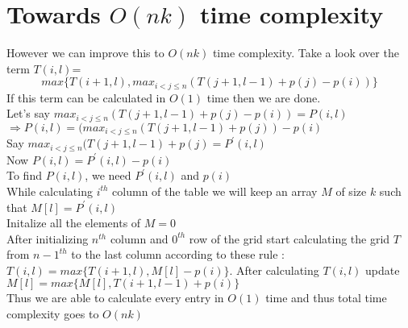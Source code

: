 \documentclass{article}
\begin{document}
\section{Towards $O(nk)$ time complexity}
However we can improve this to $O(nk)$ time complexity. Take a look over the term $T(i,l)$=$$max\{T(i+1,l),max_{i<j\leq n}(T(j+1,l-1)+p(j)-p(i))\}$$
If this term can be calculated in $O(1)$ time then we are done.\\
Let's say $max_{i<j\leq n}(T(j+1,l-1)+p(j)-p(i))=P(i,l)$\\
$\Rightarrow P(i,l)=(max_{i<j\leq n}(T(j+1,l-1)+p(j))-p(i)$\\
Say $max_{i<j\leq n}(T(j+1,l-1)+p(j)=P^{'}(i,l)$\\
Now $P(i,l)=P^{'}(i,l)-p(i)$\\
To find $P(i,l)$, we need $P^{'}(i,l)$ and $p(i)$\\
While calculating $i^{th}$ column of the table we will keep an array $M$ of size $k$ such that $M[l]=P^{'}(i,l)$\\
Initalize all the elements of $M=0$\\
After initializing $n^{th}$ column and $0^{th}$ row of the grid start calculating the grid $T$ from $n-1^{th}$ to the last column according to these rule :\\
$T(i,l)=max\{T(i+1,l),M[l]-p(i)\}$. After calculating $T(i,l)$ update $M[l]=max\{M[l],T(i+1,l-1)+p(i)\}$\\
Thus we are able to calculate every entry in $O(1)$ time and thus total time complexity goes to $O(nk)$\\
\end{document}
